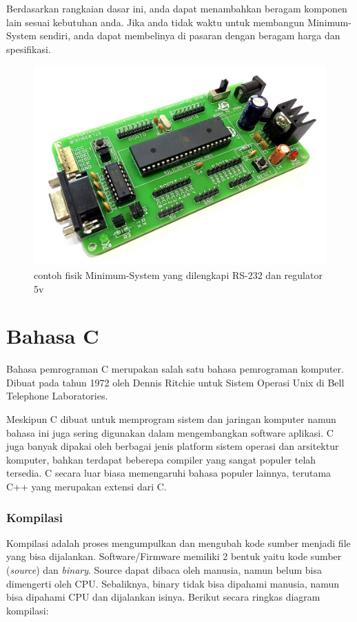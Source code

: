 \documentclass[12pt,]{article}
\begin{document}
	Berdasarkan rangkaian dasar ini, anda dapat menambahkan beragam komponen lain sesuai kebutuhan anda.
	Jika anda tidak waktu untuk membangun Minimum-System sendiri, anda dapat membelinya di pasaran dengan beragam harga dan spesifikasi.
	
	\begin{figure}[H]
		\centering
		\includegraphics[width=0.6\linewidth]{images/minsyshard}
		\caption{contoh fisik Minimum-System yang dilengkapi RS-232 dan regulator 5v}
	\end{figure}

	\newpage
	\section{Bahasa C}
	Bahasa pemrograman C merupakan salah satu bahasa pemrograman komputer. Dibuat pada tahun 1972 oleh Dennis Ritchie untuk Sistem Operasi Unix di Bell Telephone Laboratories.
	
	Meskipun C dibuat untuk memprogram sistem dan jaringan komputer namun bahasa ini juga sering digunakan dalam mengembangkan software aplikasi.
	C juga banyak dipakai oleh berbagai jenis platform sistem operasi dan arsitektur komputer, bahkan terdapat beberepa compiler yang sangat populer telah tersedia.
	C secara luar biasa memengaruhi bahasa populer lainnya, terutama C++ yang merupakan extensi dari C.
	
	\subsubsection{Kompilasi}
	Kompilasi adalah proses mengumpulkan dan mengubah kode sumber menjadi file yang bisa dijalankan.
	Software/Firmware memiliki 2 bentuk yaitu kode sumber (\textit{source}) dan \textit{binary}.
	Source dapat dibaca oleh manusia, namun belum bisa dimengerti oleh CPU.
	Sebaliknya, binary tidak bisa dipahami manusia, namun bisa dipahami CPU dan dijalankan isinya. 
	Berikut secara ringkas diagram kompilasi:
	
\end{document}
